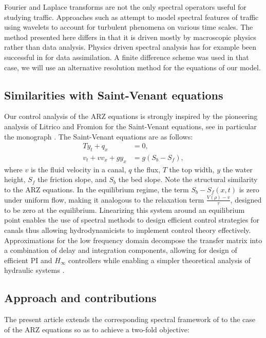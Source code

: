\documentclass[preprint]{elsarticle}
\begin{document}
Fourier and Laplace transforms are not the only spectral operators useful for studying traffic. Approaches such as \cite{Zheng2011} attempt to model spectral features of traffic using wavelets to account for turbulent phenomena on various time scales. The method presented here differs in that it is driven mostly by macroscopic physics rather than data analysis. Physics driven spectral analysis has for example been successful in \cite{fourierGalerkin} for data assimilation. A finite difference scheme was used in that case, we will use an alternative resolution method for the equations of our model.

\subsection{Similarities with Saint-Venant equations}
Our control analysis of the ARZ equations is strongly
inspired by the pioneering analysis of Litrico and Fromion for the Saint-Venant equations, see in particular the monograph \cite{litrico2009modeling}. The Saint-Venant equations are as follows:
\begin{align}
Ty_t+q_x&=0, \\
v_t + vv_x + gy_x&=g\left(S_{b}-S_{f}\right),
\end{align}
where $v$ is the fluid velocity in a canal, $q$ the flux, $T$ the top width, $y$ the water height, $S_f$ the friction slope, and $S_b$ the bed slope. Note the structural similarity to the ARZ equations. In the equilibrium regime, the term $S_{b}-S_{f}\left(x,t\right)$ is zero under uniform flow, making it analogous to the relaxation term $\frac{V(\rho)-v}{\tau}$, designed to be zero at the equilibrium. Linearizing this system around an equilibrium point enables the use of spectral methods to design efficient control strategies for canals \cite{Litricoapplic} thus allowing hydrodynamicists to implement control theory effectively. Approximations for the low frequency domain decompose the transfer matrix into a combination of delay and integration components, allowing for design of efficient PI and $H_\infty$ controllers while enabling a simpler theoretical analysis of hydraulic systems \cite{litrico2009modeling, Litricoapplic}.

\subsection{Approach and contributions}
The present article extends the corresponding spectral framework of \cite{litrico2009modeling} to the case of the ARZ equations so as to achieve a two-fold objective:
\end{document}
